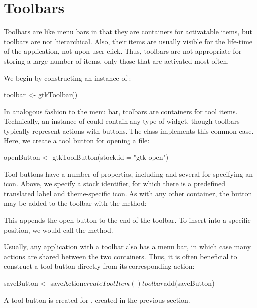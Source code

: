 \section{Toolbars}
\label{sec:RGtk2:toolbars}

Toolbars are like menu bars in that they are containers for
activatable items, but toolbars are not hierarchical. Also, their
items are usually visible for the life-time of the application, not
upon user click. Thus, toolbars are not appropriate for storing a
large number of items, only those that are activated most often.

We begin by constructing an instance of :
\begin{Schunk}
\begin{Sinput}
 toolbar <- gtkToolbar()
\end{Sinput}
\end{Schunk}

In analogous fashion to the menu bar, toolbars are containers for tool
items. Technically, an instance of  could contain
any type of widget, though toolbars typically represent actions
with buttons. The  class implements this common
case.  Here, we create a tool button for opening a file:
\begin{Schunk}
\begin{Sinput}
 openButton <- gtkToolButton(stock.id = "gtk-open") 
\end{Sinput}
\end{Schunk}
%
Tool buttons have a number of properties, including  and
several for specifying an icon. Above, we specify a stock identifier,
for which there is a predefined translated label and theme-specific icon.
As with any other container, the button may be added to the toolbar with
the  method:
\begin{Schunk}
\end{Schunk}
%
This appends the open button to the end of the toolbar. To insert into
a specific position, we would call the  method.

Usually, any application with a toolbar also has a menu bar, in which
case many actions are shared between the two containers. Thus, it is
often beneficial to construct a tool button directly from its
corresponding action:
\begin{Schunk}
\begin{Sinput}
 saveButton <- saveAction$createToolItem()
 toolbar$add(saveButton)
\end{Sinput}
\end{Schunk}
%
A tool button is created for , created in the
previous section.

